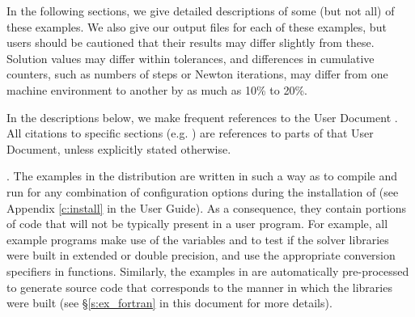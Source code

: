 \vspace{0.2in}\noindent 
In the following sections, we give detailed descriptions of some (but
not all) of these examples.  We also give our output files for
each of these examples, but users should be cautioned that their
results may differ slightly from these.  Solution
values may differ within tolerances, and differences in cumulative
counters, such as numbers of steps or Newton iterations, may differ
from one machine environment to another by as much as 10\% to 20\%.

In the descriptions below, we make frequent references to the {\ida}
User Document \cite{ida_ug}.  All citations to specific sections
(e.g. ) are references to parts of that User Document, unless
explicitly stated otherwise.

\vspace{0.2in}. 
The examples in the {\ida} distribution are written in such a way as
to compile and run for any combination of configuration options during the
installation of {\sundials} (see Appendix \ref{c:install} in the User Guide).
As a consequence, they contain portions of code that will not be typically present in a
user program. For example, all example programs make use of the
variables  and 
to test if the solver libraries were built in extended or double precision,
and use the appropriate conversion specifiers in  functions.
Similarly, the {\F} examples in {\fida} are automatically
pre-processed to generate source code that corresponds to the manner
in which the {\ida} libraries were built (see \S\ref{s:ex_fortran} in
this document for more details).
